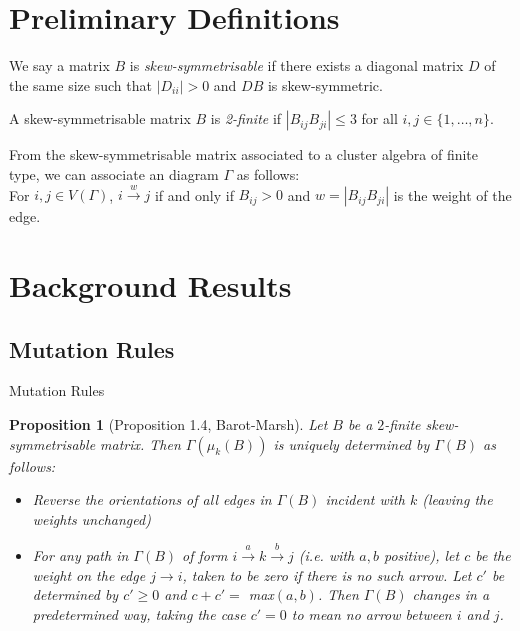 \documentclass{beamer}
\newtheorem{proposition}{Proposition}
\begin{document}
\section{Preliminary Definitions}

\begin{frame}
\begin{definition}
We say a matrix $B$ is \textit{skew-symmetrisable} if there exists a diagonal matrix $D$ of the same size such that $|D_{ii}|>0$ and $DB$ is skew-symmetric.
\end{definition}

\pause

\begin{definition}
A skew-symmetrisable matrix $B$ is \textit{2-finite} if $|B_{ij}B_{ji}| \leq 3$ for all $i, j \in \{ 1, \ldots, n \}$.
\end{definition}

\pause

From the skew-symmetrisable matrix associated to a cluster algebra of finite type, we can associate an diagram $\Gamma$ as follows:\\


For $i, j \in V(\Gamma)$, $i \xrightarrow{w} j$ if and only if $B_{ij}>0$ and $w = |B_{ij}B_{ji}|$ is the weight of the edge.

\end{frame}


\section{Background Results}

\subsection{Mutation Rules}

\begin{frame}{Mutation Rules}
\begin{proposition}
[Proposition 1.4, Barot-Marsh]
Let $B$ be a $2$-finite skew-symmetrisable matrix. Then $\Gamma(\mu_k(B))$ is uniquely determined by $\Gamma(B)$ as follows:
\begin{itemize}
\item Reverse the orientations of all edges in $\Gamma(B)$ incident with $k$ (leaving the weights unchanged)
\item For any path in $\Gamma(B)$ of form $i \xrightarrow{a} k \xrightarrow{b} j$ (i.e. with $a,b$ positive), let $c$ be the weight on the edge $j \rightarrow i$, taken to be zero if there is no such arrow. Let $c'$ be determined by $c'\geq 0$ and 
$c+c' =$ max$(a,b)$. 
Then $\Gamma(B)$ changes in a predetermined way, taking the case $c' = 0$ to mean no arrow between $i$ and $j$.

\end{itemize}
\end{proposition}

\end{frame}
\end{document}
